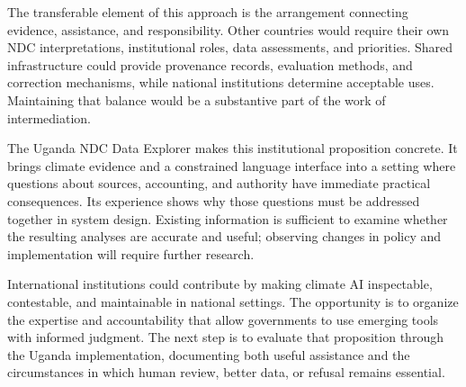\documentclass[11pt]{article}
\begin{document}
The transferable element of this approach is the arrangement connecting evidence, assistance, and responsibility. Other countries would require their own NDC interpretations, institutional roles, data assessments, and priorities. Shared infrastructure could provide provenance records, evaluation methods, and correction mechanisms, while national institutions determine acceptable uses. Maintaining that balance would be a substantive part of the work of intermediation.

The Uganda NDC Data Explorer makes this institutional proposition concrete. It brings climate evidence and a constrained language interface into a setting where questions about sources, accounting, and authority have immediate practical consequences. Its experience shows why those questions must be addressed together in system design. Existing information is sufficient to examine whether the resulting analyses are accurate and useful; observing changes in policy and implementation will require further research.

International institutions could contribute by making climate AI inspectable, contestable, and maintainable in national settings. The opportunity is to organize the expertise and accountability that allow governments to use emerging tools with informed judgment. The next step is to evaluate that proposition through the Uganda implementation, documenting both useful assistance and the circumstances in which human review, better data, or refusal remains essential.
\end{document}
